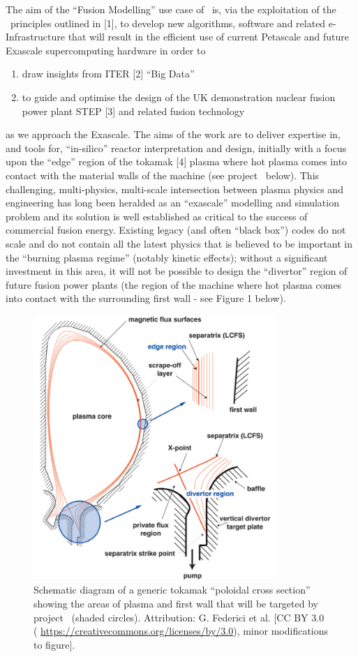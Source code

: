 The aim of the ``Fusion Modelling'' use case of \exc \   
is, via the exploitation of the \exc \   principles outlined in [1], to develop 
new algorithms, software and related e-Infrastructure that will result in the efficient 
use of current Petascale and future Exascale supercomputing hardware in order to
\begin{enumerate}
\item draw insights from ITER [2] ``Big Data'' 
\item to guide and optimise the design of the UK demonstration nuclear fusion
power plant STEP [3] and related fusion technology
\end{enumerate}
as we approach the Exascale. The aims of the work are to deliver expertise 
in, and tools for, ``in-silico'' reactor interpretation and design, initially with 
a focus upon the ``edge'' region of the tokamak [4] plasma where hot plasma comes 
into contact with the material walls of the machine (see project \nep \   below). 
This challenging, multi-physics, multi-scale intersection between plasma physics 
and engineering has long been heralded as an ``exascale'' modelling and simulation 
problem and its solution is well established as critical to the success of commercial 
fusion energy. Existing legacy (and often ``black box'') codes do not scale and 
do not contain all the latest physics that is believed to be important in the ``burning 
plasma regime'' (notably kinetic effects); without a significant investment in 
this area, it will not be possible to design the ``divertor'' region of future 
fusion power plants (the region of the machine where hot plasma comes into contact 
with the surrounding first wall - see Figure 1 below).

\begin{figure}[htbp]
\centerline{\includegraphics[width=261pt, height=285pt, keepaspectratio=true]{../corpics/edge_geometry.png}}
\caption{Schematic diagram of a generic tokamak ``poloidal 
cross section'' showing the areas of plasma and first wall that will be targeted 
by project \nep \   (shaded circles). Attribution: G. Federici et al. [CC BY 3.0 
( \url{https://creativecommons.org/licenses/by/3.0}),
minor modifications to figure]. }
\end{figure}

